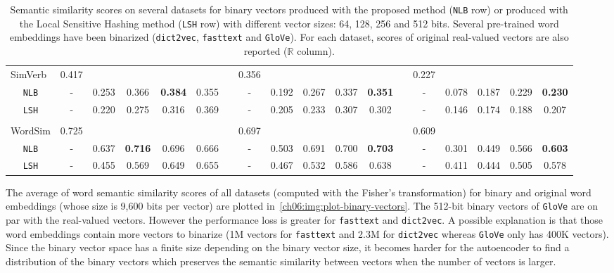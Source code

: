 \begin{table}[b!]
{\begin{tabular}{@{}lcccccrcccccrccccc@{}}
            SimVerb & 0.417 &&&&&& 0.356 &&&&&& 0.227\\
              \multicolumn{1}{c}{\texttt{NLB}}
                &-& 0.253 & 0.366 & \textbf{0.384} & 0.355 &
                &-& 0.192 & 0.267 & 0.337 & \textbf{0.351} &
                &-& 0.078 & 0.187 & 0.229 & \textbf{0.230}\\
              \multicolumn{1}{c}{\texttt{LSH}}
                &-& 0.220 & 0.275 & 0.316 & 0.369 &
                &-& 0.205 & 0.233 & 0.307 & 0.302 &
                &-& 0.146 & 0.174 & 0.188 & 0.207\\\\

            WordSim & 0.725 &&&&&& 0.697 &&&&&& 0.609\\
              \multicolumn{1}{c}{\texttt{NLB}}
                &-& 0.637 & \textbf{0.716} & 0.696 & 0.666 &
                &-& 0.503 & 0.691 & 0.700 & \textbf{0.703} &
                &-& 0.301 & 0.449 & 0.566 & \textbf{0.603}\\
              \multicolumn{1}{c}{\texttt{LSH}}
                &-& 0.455 & 0.569 & 0.649 & 0.655 &
                &-& 0.467 & 0.532 & 0.586 & 0.638 &
                &-& 0.411 & 0.444 & 0.505 & 0.578\\
          \bottomrule[0.15em]
        \end{tabular}}
        \caption[Evaluation of binary and real-valued vectors on a semantic
        similarity task.]{Semantic similarity scores on several datasets for
        binary vectors produced with the proposed method (\texttt{NLB} row) or
        produced with the Local Sensitive Hashing method (\texttt{LSH} row) with
        different vector sizes: 64, 128, 256 and 512 bits. Several pre-trained
        word embeddings have been binarized (\texttt{dict2vec},
        \texttt{fasttext} and \texttt{GloVe}). For each dataset, scores of
        original real-valued vectors are also reported ($\mathbb{R}$ column).}
        \label{ch06:tab:results-binary-semantic}
      \end{table}

      \noindent The average of word semantic similarity scores of all datasets
      (computed with the Fisher's transformation) for binary and original word
      embeddings (whose size is 9,600 bits per vector) are plotted
      in~\autoref{ch06:img:plot-binary-vectors}. The 512-bit binary vectors of
      \texttt{GloVe} are on par with the real-valued vectors. However the
      performance loss is greater for \texttt{fasttext} and \texttt{dict2vec}. A
      possible explanation is that those word embeddings contain more vectors to
      binarize (1M vectors for \texttt{fasttext} and 2.3M for
      \texttt{dict2vec} whereas \texttt{GloVe} only has 400K vectors). Since the
      binary vector space has a finite size depending on the binary vector size,
      it becomes harder for the autoencoder to find a distribution of the binary
      vectors which preserves the semantic similarity between vectors when the
      number of vectors is larger.

